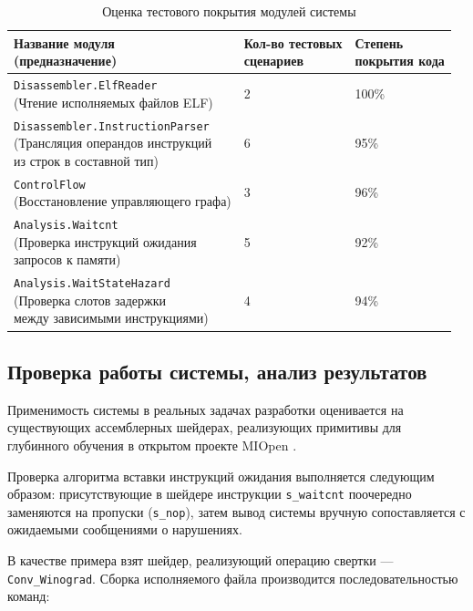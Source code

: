 \documentclass[a4paper,14pt]{extarticle}
\begin{document}
{\begin{table}[H]
\caption{Оценка тестового покрытия модулей системы}
\label{table:test-coverage}
\begin{tabular}{|l|l|l|}
\hline
\thead{Название модуля \\ (предназначение)} & \thead{Кол-во тестовых \\ сценариев} & \thead{Степень \\ покрытия кода} \\\hline
\makecell[l]{\texttt{Disassembler.ElfReader}\\[2mm] (Чтение исполняемых файлов ELF)} & 2 & 100\% \\\hline
\makecell[l]{\texttt{Disassembler.InstructionParser}\\[2mm] (Трансляция операндов инструкций\\из строк в составной тип)} & 6 & 95\% \\\hline
\makecell[l]{\texttt{ControlFlow}\\[2mm] (Восстановление управляющего графа)} & 3 & 96\% \\\hline
  \makecell[l]{\texttt{Analysis.Waitcnt}\\[2mm] (Проверка инструкций ожидания\\запросов к памяти)} & 5 & 92\% \\\hline
\makecell[l]{\texttt{Analysis.WaitStateHazard}\\[2mm] (Проверка слотов задержки\\между зависимыми инструкциями)} & 4 & 94\% \\\hline
\end{tabular}
\end{table}

\subsection{Проверка работы системы, анализ результатов}

Применимость системы в реальных задачах разработки оценивается на существующих
ассемблерных шейдерах, реализующих примитивы для глубинного обучения
в открытом проекте MIOpen \cite{miopen}.

Проверка алгоритма вставки инструкций ожидания выполняется следующим образом:
присутствующие в шейдере инструкции \verb|s_waitcnt| поочередно заменяются на
пропуски (\verb|s_nop|), затем вывод системы вручную сопоставляется с ожидаемыми
сообщениями о нарушениях.

В качестве примера взят шейдер, реализующий операцию свертки — \verb|Conv_Winograd|.
Сборка исполняемого файла производится последовательностью команд:

}
\end{document}
